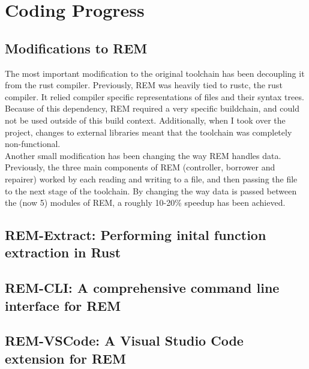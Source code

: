 \section{Coding Progress}

\subsection*{Modifications to REM}

The most important modification to the original toolchain has been decoupling it
from the rust compiler. Previously, REM was heavily tied to rustc, the rust
compiler. It relied compiler specific representations of files and their syntax
trees. Because of this dependency, REM required a very specific buildchain, and
could not be used outside of this build context. Additionally, when I took over
the project, changes to external libraries meant that the toolchain was
completely non-functional. \\
Another small modification has been changing the way REM handles data.
Previously, the three main components of REM (controller, borrower and repairer)
worked by each reading and writing to a file, and then passing the file to the
next stage of the toolchain. By changing the way data is passed between the (now
5) modules of REM, a roughly 10-20\% speedup has been achieved.

\subsection*{REM-Extract: Performing inital function extraction in Rust}

\subsection*{REM-CLI: A comprehensive command line interface for REM}

\subsection*{REM-VSCode: A Visual Studio Code extension for REM}
